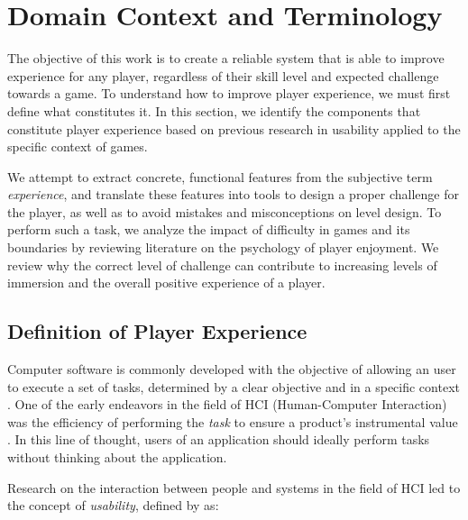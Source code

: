 \section{Domain Context and Terminology}

The objective of this work is to create a reliable system that is able to improve experience for any player, regardless of their skill level and expected challenge towards a game. To understand how to improve player experience, we must first define what constitutes it. In this section, we identify the components that constitute player experience based on previous research in usability applied to the specific context of games. 

We attempt to extract concrete, functional features from the subjective term \emph{experience}, and translate these features into tools to design a proper challenge for the player, as well as to avoid mistakes and misconceptions on level design. To perform such a task, we analyze the impact of difficulty in games and its boundaries by reviewing literature on the psychology of player enjoyment. We review why the correct level of challenge can contribute to increasing levels of immersion and the overall positive experience of a player.

\subsection{Definition of Player Experience}

Computer software is commonly developed with the objective of allowing an user to execute a set of tasks, determined by a clear objective and in a specific context \cite{ARTICLE_FromUsabilityToPlayability}. One of the early endeavors in the field of HCI (Human-Computer Interaction) was the efficiency of performing the \emph{task} to ensure a product's instrumental value \cite{ARTICLE_UserExperienceAResearchAgenda}. In this line of thought, users of an application should ideally perform tasks without thinking about the application. 

Research on the interaction between people and systems in the field of HCI led to the concept of \emph{usability}, defined by \cite{ISO_ISO92411} as:

